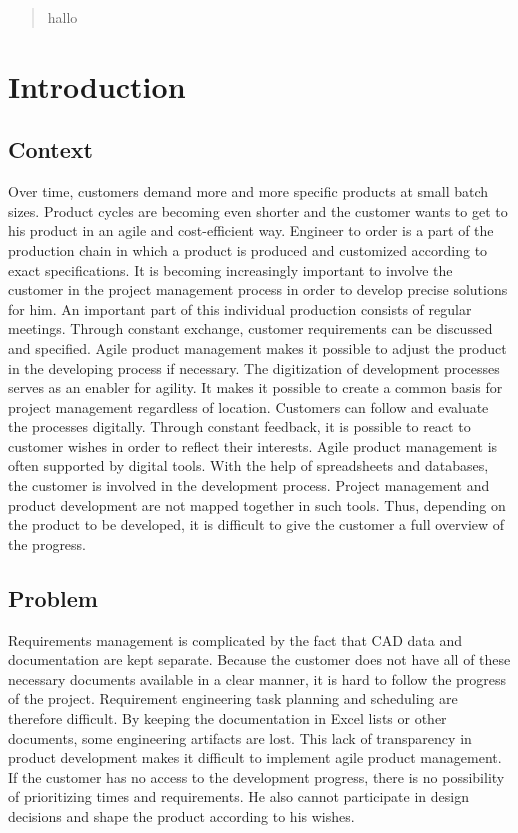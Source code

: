\begin{abstract}
    hallo
    ~\cite{Hackenberg2014}~\cite{Legat2014}~\cite{Teufl2015}
\end{abstract}

\section{Introduction}
    \label{sec:introduction}

    \subsection*{Context}
    Over time, customers demand more and more specific products at small batch sizes. Product cycles are becoming even shorter and the customer wants to get to his product in an agile and cost-efficient way. Engineer to order is a part of the production chain in which a product is produced and customized according to exact specifications. It is becoming increasingly important to involve the customer in the project management process in order to develop precise solutions for him. 
    An important part of this individual production consists of regular meetings. Through constant exchange, customer requirements can be discussed and specified. Agile product management makes it possible to adjust the product in the developing process if necessary. 
    The digitization of development processes serves as an enabler for agility. It makes it possible to create a common basis for project management regardless of location. Customers can follow and evaluate the processes digitally. Through constant feedback, it is possible to react to customer wishes in order to reflect their interests. Agile product management is often supported by digital tools. With the help of spreadsheets and databases, the customer is involved in the development process. Project management and product development are not mapped together in such tools. Thus, depending on the product to be developed, it is difficult to give the customer a full overview of the progress.

    \subsection*{Problem}
    Requirements management is complicated by the fact that CAD data and documentation are kept separate. Because the customer does not have all of these necessary documents available in a clear manner, it is hard to follow the progress of the project. Requirement engineering task planning and scheduling are therefore difficult. By keeping the documentation in Excel lists or other documents, some engineering artifacts are lost. This lack of transparency in product development makes it difficult to implement agile product management. If the customer has no access to the development progress, there is no possibility of prioritizing times and requirements. He also cannot participate in design decisions and shape the product according to his wishes.

